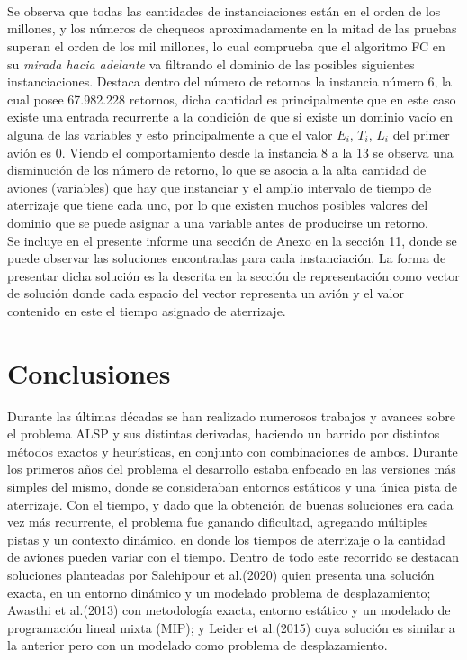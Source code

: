 \documentclass[letter, 10pt]{article}
\begin{document}
\\
\\
\\
Se observa que todas las cantidades de instanciaciones están en el orden de los millones, y los números de chequeos aproximadamente en la mitad de las pruebas superan el orden de los mil millones, lo cual comprueba que el algoritmo FC en su \textit{mirada hacia adelante} va filtrando el dominio de las posibles siguientes instanciaciones. Destaca dentro del número de retornos la instancia número 6, la cual posee 67.982.228 retornos, dicha cantidad es principalmente que en este caso existe una entrada recurrente a la condición de que si existe un dominio vacío en alguna de las variables y esto principalmente a que el valor $E_i$, $T_i$, $L_i$ del primer avión es 0. Viendo el comportamiento desde la instancia 8 a la 13 se observa una disminución de los número de retorno, lo que se asocia a la alta cantidad de aviones (variables) que hay que instanciar y el amplio intervalo de tiempo de aterrizaje que tiene cada uno, por lo que existen muchos posibles valores del dominio que se puede asignar a una variable antes de producirse un retorno.\\

Se incluye en el presente informe una sección de Anexo en la sección 11, donde se puede observar las soluciones encontradas para cada instanciación. La forma de presentar dicha solución es la descrita en la sección de representación como vector de solución donde cada espacio del vector representa un avión y el valor contenido en este el tiempo asignado de aterrizaje.

\section{Conclusiones}
Durante las últimas décadas se han realizado numerosos trabajos y avances sobre el problema ALSP y sus distintas derivadas, haciendo un barrido por distintos métodos exactos y heurísticas, en conjunto con combinaciones de ambos. Durante los primeros años del problema el desarrollo estaba enfocado en las versiones más simples del mismo, donde se consideraban entornos estáticos y una única pista de aterrizaje. Con el tiempo, y dado que la obtención de buenas soluciones era cada vez más recurrente, el problema fue ganando dificultad, agregando múltiples pistas y un contexto dinámico, en donde los tiempos de aterrizaje o la cantidad de aviones pueden variar con el tiempo. Dentro de todo este recorrido se destacan soluciones planteadas por Salehipour et al.(2020)\cite{SALEHIPOUR2020179} quien presenta una solución exacta, en un entorno dinámico y un modelado problema de desplazamiento; Awasthi et al.(2013)\cite{2013} con metodología exacta, entorno estático y un modelado de programación lineal mixta (MIP); y Leider et al.(2015)\cite{2015} cuya solución es similar a la anterior pero con un modelado como problema de desplazamiento.\\
\end{document}
